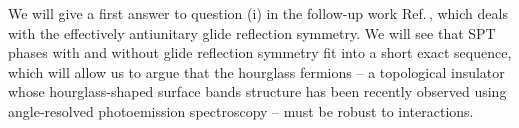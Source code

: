 \documentclass[sort&compress]{elsarticle}
\theoremstyle{theoremstyle}
\theoremstyle{framedtheoremstyle}
\theoremstyle{definitionstyle}
\theoremstyle{definitionstyle}
\theoremstyle{definitionstyle}
\theoremstyle{definitionstyle}
\theoremstyle{nameddefinitionstyle}
\theoremstyle{framednameddefinitionstyle}
\theoremstyle{proofstyle}
\theoremstyle{definitionstyle}
\begin{document}
We will give a first answer to question (i) in the follow-up work Ref.\,\cite{Xiong_Alexandradinata}, which deals with the effectively antiunitary glide reflection symmetry. We will see that SPT phases with and without glide reflection symmetry fit into a short exact sequence, which will allow us to argue that the hourglass fermions \cite{Nonsymm_Shiozaki, Hourglass, Cohomological} -- a topological insulator whose hourglass-shaped surface bands structure has been recently observed using angle-resolved photoemission spectroscopy \cite{Ma_discoverhourglass} -- must be robust to interactions.


















\newpage
\end{document}

